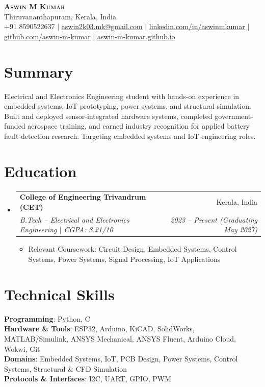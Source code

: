\documentclass[letterpaper,10pt]{article}
\makeatletter
\newcommand{\resumeItem}[1]{
  \item\small{#1 \vspace{-2pt}}
}
\newcommand{\resumeSubheading}[4]{
  \vspace{-2pt}\item
    \begin{tabular*}{0.97\textwidth}[t]{l@{\extracolsep{\fill}}r}
      \textbf{#1} & #2 \\
      \textit{\small#3} & \textit{\small #4} \\
    \end{tabular*}\vspace{-7pt}
}
\newcommand{\resumeSubHeadingListStart}{\begin{itemize}[leftmargin=0.15in, label={}]}
\newcommand{\resumeSubHeadingListEnd}{\end{itemize}}
\newcommand{\resumeItemListStart}{\begin{itemize}}
\newcommand{\resumeItemListEnd}{\end{itemize}\vspace{-5pt}}
\makeatother
\begin{document}
\begin{center}
    \textbf{\Huge \scshape Aswin M Kumar} \\ \vspace{1pt}
    \small Thiruvananthapuram, Kerala, India \\
    \small +91 8590522637 $|$
    \href{mailto:aswin2k03.mk@gmail.com}{\underline{aswin2k03.mk@gmail.com}} $|$
    \href{https://linkedin.com/in/aswinmkumar}{\underline{linkedin.com/in/aswinmkumar}} $|$
    \href{https://github.com/aswin-m-kumar}{\underline{github.com/aswin-m-kumar}} $|$
    \href{https://aswin-m-kumar.github.io}{\underline{aswin-m-kumar.github.io}}
\end{center}

\section{Summary}
\small{
Electrical and Electronics Engineering student with hands-on experience in embedded systems, IoT prototyping, power systems, and structural simulation. Built and deployed sensor-integrated hardware systems, completed government-funded aerospace training, and earned industry recognition for applied battery fault-detection research. Targeting embedded systems and IoT engineering roles.
}

\section{Education}
  \resumeSubHeadingListStart
    \resumeSubheading
      {College of Engineering Trivandrum (CET)}{Kerala, India}
      {B.Tech -- Electrical and Electronics Engineering $|$ CGPA: 8.21/10}{2023 -- Present (Graduating May 2027)}
    \resumeItemListStart
      \resumeItem{Relevant Coursework: Circuit Design, Embedded Systems, Control Systems, Power Systems, Signal Processing, IoT Applications}
    \resumeItemListEnd
  \resumeSubHeadingListEnd

\section{Technical Skills}
 \begin{itemize}[leftmargin=0.15in, label={}]
    \small{\item{
     \textbf{Programming}{: Python, C} \\
     \textbf{Hardware \& Tools}{: ESP32, Arduino, KiCAD, SolidWorks, MATLAB/Simulink, ANSYS Mechanical, ANSYS Fluent, Arduino Cloud, Wokwi, Git} \\
     \textbf{Domains}{: Embedded Systems, IoT, PCB Design, Power Systems, Control Systems, Structural \& CFD Simulation} \\
     \textbf{Protocols \& Interfaces}{: I2C, UART, GPIO, PWM}
    }}
 \end{itemize}
\end{document}
